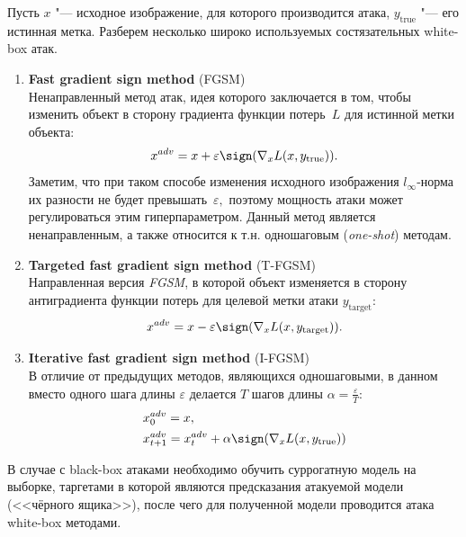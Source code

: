 \documentclass[12pt,a4paper]{article}
\begin{document}
\par Пусть $x$ "--- исходное изображение, для которого производится атака, $y_{\text{true}}$ "--- его истинная метка. Разберем несколько широко используемых состязательных white-box атак.
\begin{enumerate}
	\item \textbf{Fast gradient sign method} (FGSM)\\
	Ненаправленный метод атак, идея которого заключается в том, чтобы изменить объект в сторону градиента функции потерь~$L$ для истинной метки объекта:
	\[
		x^{adv} = x + \varepsilon \sign (\nabla_x L(x, y_{\text{true}})).
	\]
	Заметим, что при таком способе изменения исходного изображения $l_\infty$-норма их разности не будет превышать~$\varepsilon,$ поэтому мощность атаки может регулироваться этим гиперпараметром. Данный метод является ненаправленным, а также относится к т.н. одношаговым (\emph{one-shot}) методам.
	\item \textbf{Targeted fast gradient sign method} (T-FGSM)\\
	Направленная версия \textit{FGSM}, в которой объект изменяется в сторону антиградиента функции потерь для целевой метки атаки $y_{\text{target}}:$
	\[
		x^{adv} = x - \varepsilon \sign (\nabla_x L(x, y_{\text{target}})).
	\]
	\item \textbf{Iterative fast gradient sign method} (I-FGSM)\\
	В отличие от предыдущих методов, являющихся одношаговыми, в данном вместо одного шага длины $\varepsilon$ делается $T$ шагов длины $\alpha = \frac{\varepsilon}{T}:$
	\begin{align}
		&x_0^{adv} = x \notag,\\
		&x_{t+1}^{adv} = x_t^{adv} + \alpha \sign (\nabla_x L(x, y_{\text{true}})) \notag
	\end{align}
\end{enumerate}


В случае с black-box атаками необходимо обучить суррогатную модель на выборке, таргетами в которой являются предсказания атакуемой модели (<<чёрного ящика>>), после чего для полученной модели проводится атака white-box методами.

\nocite{ribeiro2016should}
\nocite{medium_adversarial}


\end{document}
